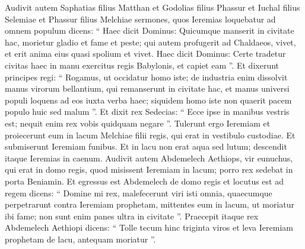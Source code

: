 \begin{biblechapter}
\begin{biblechapter}
\begin{biblechapter}
\begin{biblechapter}
\begin{biblechapter}
\begin{biblechapter}
\begin{biblechapter}
\begin{biblechapter}
\begin{biblechapter}
\begin{biblechapter}
\begin{biblechapter}
\begin{biblechapter}
\begin{biblechapter}
\begin{biblechapter}
\begin{biblechapter}
\begin{biblechapter}
\begin{biblechapter}
\begin{biblechapter}
\begin{biblechapter}
\begin{biblechapter}
\begin{biblechapter}
\begin{biblechapter}
\begin{biblechapter}
\begin{biblechapter}
\begin{biblechapter}
\begin{biblechapter}
\begin{biblechapter}
\begin{biblechapter}
\begin{biblechapter}
\begin{biblechapter}
\begin{biblechapter}
\begin{biblechapter}
\begin{biblechapter}
\begin{biblechapter}
\begin{biblechapter}
\begin{biblechapter}
\begin{biblechapter}
\begin{biblechapter}
\verse Audivit autem Saphatias filius Matthan et Godolias filius Phassur et Iuchal filius Selemiae et Phassur filius Melchiae sermones, quos Ieremias loquebatur ad omnem populum dicens: 
\verse “ Haec dicit Dominus: Quicumque manserit in civitate hac, morietur gladio et fame et peste; qui autem profugerit ad Chaldaeos, vivet, et erit anima eius quasi spolium et vivet. 
\verse Haec dicit Dominus: Certe tradetur civitas haec in manu exercitus regis Babylonis, et capiet eam ”.
 \verse Et dixerunt principes regi: “ Rogamus, ut occidatur homo iste; de industria enim dissolvit manus virorum bellantium, qui remanserunt in civitate hac, et manus universi populi loquens ad eos iuxta verba haec; siquidem homo iste non quaerit pacem populo huic sed malum ”. 
\verse Et dixit rex Sedecias: “ Ecce ipse in manibus vestris est; nequit enim rex vobis quidquam negare ”. 
\verse Tulerunt ergo Ieremiam et proiecerunt eum in lacum Melchiae filii regis, qui erat in vestibulo custodiae. Et submiserunt Ieremiam funibus. Et in lacu non erat aqua sed lutum; descendit itaque Ieremias in caenum.
 \verse Audivit autem Abdemelech Aethiops, vir eunuchus, qui erat in domo regis, quod misissent Ieremiam in lacum; porro rex sedebat in porta Beniamin. 
\verse Et egressus est Abdemelech de domo regis et locutus est ad regem dicens: 
\verse “ Domine mi rex, malefecerunt viri isti omnia, quaecumque perpetrarunt contra Ieremiam prophetam, mittentes eum in lacum, ut moriatur ibi fame; non sunt enim panes ultra in civitate ”. 
\verse Praecepit itaque rex Abdemelech Aethiopi dicens: “ Tolle tecum hinc triginta viros et leva Ieremiam prophetam de lacu, antequam moriatur ”. 

\end{biblechapter}
\end{biblechapter}
\end{biblechapter}
\end{biblechapter}
\end{biblechapter}
\end{biblechapter}
\end{biblechapter}
\end{biblechapter}
\end{biblechapter}
\end{biblechapter}
\end{biblechapter}
\end{biblechapter}
\end{biblechapter}
\end{biblechapter}
\end{biblechapter}
\end{biblechapter}
\end{biblechapter}
\end{biblechapter}
\end{biblechapter}
\end{biblechapter}
\end{biblechapter}
\end{biblechapter}
\end{biblechapter}
\end{biblechapter}
\end{biblechapter}
\end{biblechapter}
\end{biblechapter}
\end{biblechapter}
\end{biblechapter}
\end{biblechapter}
\end{biblechapter}
\end{biblechapter}
\end{biblechapter}
\end{biblechapter}
\end{biblechapter}
\end{biblechapter}
\end{biblechapter}
\end{biblechapter}
